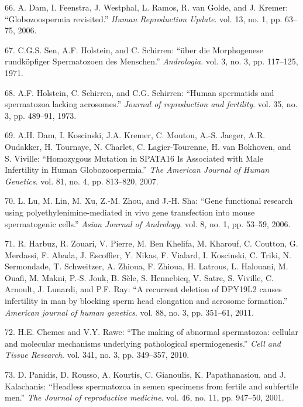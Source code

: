 \documentclass[12pt,twoside]{reedthesis}
\theoremstyle{definition}
\theoremstyle{definition}
\theoremstyle{remark}
\begin{document}
  \hypertarget{ref-Dam2006}{}
  66. A. Dam, I. Feenstra, J. Westphal, L. Ramos, R. van Golde, and J.
  Kremer: ``Globozoospermia revisited.'' \emph{Human Reproduction Update}.
  vol. 13, no. 1, pp. 63--75, 2006.
  
  \hypertarget{ref-Sen2009}{}
  67. C.G.S. Sen, A.F. Holstein, and C. Schirren: ``über die Morphogenese
  rundköpfiger Spermatozoen des Menschen.'' \emph{Andrologia}. vol. 3, no.
  3, pp. 117--125, 1971.
  
  \hypertarget{ref-Holstein1973}{}
  68. A.F. Holstein, C. Schirren, and C.G. Schirren: ``Human spermatids
  and spermatozoa lacking acrosomes.'' \emph{Journal of reproduction and
  fertility}. vol. 35, no. 3, pp. 489--91, 1973.
  
  \hypertarget{ref-Dam2007a}{}
  69. A.H. Dam, I. Koscinski, J.A. Kremer, C. Moutou, A.-S. Jaeger, A.R.
  Oudakker, H. Tournaye, N. Charlet, C. Lagier-Tourenne, H. van Bokhoven,
  and S. Viville: ``Homozygous Mutation in SPATA16 Is Associated with Male
  Infertility in Human Globozoospermia.'' \emph{The American Journal of
  Human Genetics}. vol. 81, no. 4, pp. 813--820, 2007.
  
  \hypertarget{ref-Lu2006}{}
  70. L. Lu, M. Lin, M. Xu, Z.-M. Zhou, and J.-H. Sha: ``Gene functional
  research using polyethylenimine-mediated in vivo gene transfection into
  mouse spermatogenic cells.'' \emph{Asian Journal of Andrology}. vol. 8,
  no. 1, pp. 53--59, 2006.
  
  \hypertarget{ref-Harbuz2011}{}
  71. R. Harbuz, R. Zouari, V. Pierre, M. Ben Khelifa, M. Kharouf, C.
  Coutton, G. Merdassi, F. Abada, J. Escoffier, Y. Nikas, F. Vialard, I.
  Koscinski, C. Triki, N. Sermondade, T. Schweitzer, A. Zhioua, F. Zhioua,
  H. Latrous, L. Halouani, M. Ouafi, M. Makni, P.-S. Jouk, B. Sèle, S.
  Hennebicq, V. Satre, S. Viville, C. Arnoult, J. Lunardi, and P.F. Ray:
  ``A recurrent deletion of DPY19L2 causes infertility in man by blocking
  sperm head elongation and acrosome formation.'' \emph{American journal
  of human genetics}. vol. 88, no. 3, pp. 351--61, 2011.
  
  \hypertarget{ref-Chemes2010}{}
  72. H.E. Chemes and V.Y. Rawe: ``The making of abnormal spermatozoa:
  cellular and molecular mechanisms underlying pathological
  spermiogenesis.'' \emph{Cell and Tissue Research}. vol. 341, no. 3, pp.
  349--357, 2010.
  
  \hypertarget{ref-Panidis2001}{}
  73. D. Panidis, D. Rousso, A. Kourtis, C. Gianoulis, K. Papathanasiou,
  and J. Kalachanis: ``Headless spermatozoa in semen specimens from
  fertile and subfertile men.'' \emph{The Journal of reproductive
  medicine}. vol. 46, no. 11, pp. 947--50, 2001.
  
\end{document}
